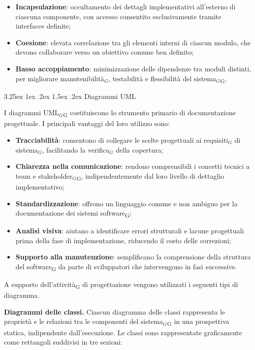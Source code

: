 \documentclass[a4paper, 10pt]{article}
\makeatletter
\renewcommand\paragraph{\@startsection{paragraph}{4}{\z@}%
  {3.25ex \@plus1ex \@minus .2ex}%
  {1.5ex \@plus .2ex}%
  {\normalfont\normalsize\bfseries}}
\makeatother
\begin{document}
\begin{itemize}
    \item \textbf{Incapsulazione}: occultamento dei dettagli implementativi all'esterno di ciascuna componente, con accesso consentito esclusivamente tramite interfacce definite;
    \item \textbf{Coesione}: elevata correlazione tra gli elementi interni di ciascun modulo, che devono collaborare verso un obiettivo comune ben definito;
    \item \textbf{Basso accoppiamento}: minimizzazione delle dipendenze tra moduli distinti, per migliorare manutenibilità$_G$, testabilità e flessibilità del sistema$_G$\textsubscript{G}.
\end{itemize}

\paragraph{Diagrammi UML}

I diagrammi UML$_G$\textsubscript{G} costituiscono lo strumento primario di documentazione progettuale. I principali vantaggi del loro utilizzo sono:

\begin{itemize}
    \item \textbf{Tracciabilità}: consentono di collegare le scelte progettuali ai requisiti$_G$ di sistema$_G$, facilitando la verifica$_G$ della copertura;
    \item \textbf{Chiarezza nella comunicazione}: rendono comprensibili i concetti tecnici a team e stakeholder$_G$\textsubscript{G}, indipendentemente dal loro livello di dettaglio implementativo;
    \item \textbf{Standardizzazione}: offrono un linguaggio comune e non ambiguo per la documentazione dei sistemi software\textsubscript{G};
    \item \textbf{Analisi visiva}: aiutano a identificare errori strutturali e lacune progettuali prima della fase di implementazione, riducendo il costo delle correzioni;
    \item \textbf{Supporto alla manutenzione}: semplificano la comprensione della struttura del software\textsubscript{G} da parte di sviluppatori che intervengono in fasi successive.
\end{itemize}

A supporto dell'attività\textsubscript{G} di progettazione vengono utilizzati i seguenti tipi di diagramma.

\textbf{Diagrammi delle classi.} Ciascun diagramma delle classi rappresenta le proprietà e le relazioni tra le componenti del sistema$_G$\textsubscript{G} in una prospettiva statica, indipendente dall'esecuzione. Le classi sono rappresentate graficamente come rettangoli suddivisi in tre sezioni:
\end{document}
